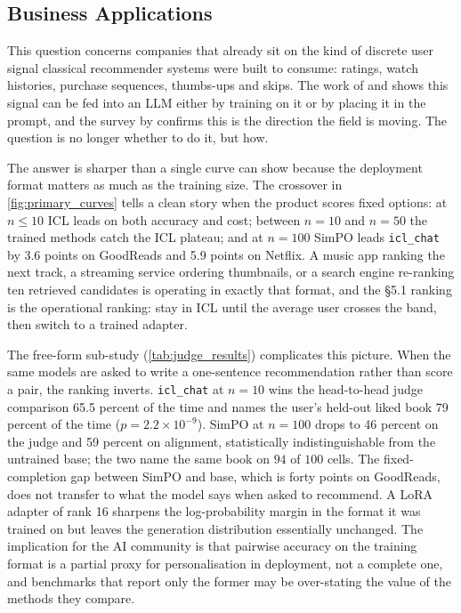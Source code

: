 \subsection{Business Applications}
\label{sec:business:framework}

This question concerns companies that already sit on the kind of discrete user signal classical recommender systems were built to consume: ratings, watch histories, purchase sequences, thumbs-ups and skips. The work of \citet{bao2023tallrec} and \citet{friedman2023recllm} shows this signal can be fed into an LLM either by training on it or by placing it in the prompt, and the survey by \citet{fan2024recllmsurvey} confirms this is the direction the field is moving. The question is no longer whether to do it, but how.

The answer is sharper than a single curve can show because the deployment format matters as much as the training size. The crossover in \cref{fig:primary_curves} tells a clean story when the product scores fixed options: at $n \leq 10$ ICL leads on both accuracy and cost; between $n = 10$ and $n = 50$ the trained methods catch the ICL plateau; and at $n = 100$ SimPO leads \texttt{icl\_chat} by 3.6 points on GoodReads and 5.9 points on Netflix. A music app ranking the next track, a streaming service ordering thumbnails, or a search engine re-ranking ten retrieved candidates is operating in exactly that format, and the §5.1 ranking is the operational ranking: stay in ICL until the average user crosses the band, then switch to a trained adapter.

The free-form sub-study (\cref{tab:judge_results}) complicates this picture. When the same models are asked to write a one-sentence recommendation rather than score a pair, the ranking inverts. \texttt{icl\_chat} at $n = 10$ wins the head-to-head judge comparison 65.5 percent of the time and names the user's held-out liked book 79 percent of the time ($p = 2.2 \times 10^{-9}$). SimPO at $n = 100$ drops to 46 percent on the judge and 59 percent on alignment, statistically indistinguishable from the untrained base; the two name the same book on $94$ of $100$ cells. The fixed-completion gap between SimPO and base, which is forty points on GoodReads, does not transfer to what the model says when asked to recommend. A LoRA adapter of rank 16 sharpens the log-probability margin in the format it was trained on but leaves the generation distribution essentially unchanged. The implication for the AI community is that pairwise accuracy on the training format is a partial proxy for personalisation in deployment, not a complete one, and benchmarks that report only the former may be over-stating the value of the methods they compare.

